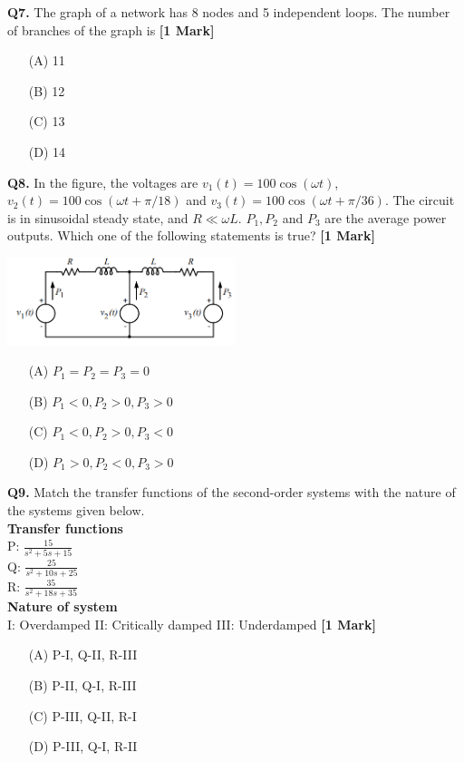 \documentclass[11pt]{article}
\newcommand{\questiona}[2]{
    \noindent\textbf{Q#2.} #1 \hfill \textbf{[1 Mark]}
}
\begin{document}
\questiona{The graph of a network has 8 nodes and 5 independent loops. The number of branches of the graph is}{7}
\begin{enumerate}
    \item[(A)] 11
    \item[(B)] 12
    \item[(C)] 13
    \item[(D)] 14
\end{enumerate}
\vspace{0.5cm}

\questiona{In the figure, the voltages are \( v_1(t) = 100 \cos(\omega t) \), \( v_2(t) = 100 \cos(\omega t + \pi/18) \) and \( v_3(t) = 100 \cos(\omega t + \pi/36) \). The circuit is in sinusoidal steady state, and \( R \ll \omega L \). \( P_1, P_2 \) and \( P_3 \) are the average power outputs. Which one of the following statements is true?}{8}
\begin{center}
\includegraphics[width=0.5\textwidth]{figures/8.png}
\end{center}
\begin{enumerate}
    \item[(A)] \( P_1 = P_2 = P_3 = 0 \)
    \item[(B)] \( P_1 < 0, P_2 > 0, P_3 > 0 \)
    \item[(C)] \( P_1 < 0, P_2 > 0, P_3 < 0 \)
    \item[(D)] \( P_1 > 0, P_2 < 0, P_3 > 0 \)
\end{enumerate}
\vspace{0.5cm}

\questiona{Match the transfer functions of the second-order systems with the nature of the systems given below. \\
\textbf{Transfer functions} \\
P: \( \frac{15}{s^2 + 5s + 15} \) \\
Q: \( \frac{25}{s^2 + 10s + 25} \) \\
R: \( \frac{35}{s^2 + 18s + 35} \) \\
\textbf{Nature of system} \\
I: Overdamped \hspace{0.5cm} II: Critically damped \hspace{0.5cm} III: Underdamped}{9}
\begin{enumerate}
    \item[(A)] P-I, Q-II, R-III
    \item[(B)] P-II, Q-I, R-III
    \item[(C)] P-III, Q-II, R-I
    \item[(D)] P-III, Q-I, R-II
\end{enumerate}
\vspace{0.5cm}
\end{document}
